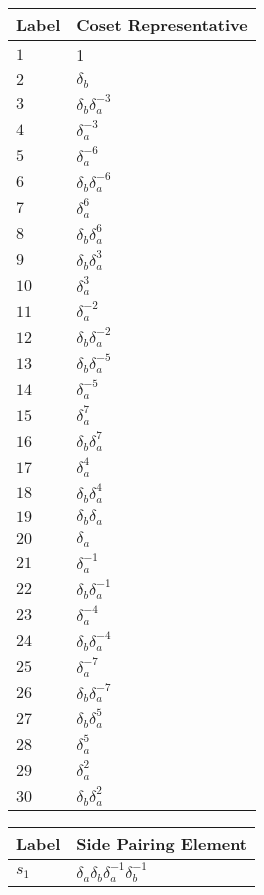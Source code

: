 \documentclass{article}
\begin{document}

\begin{center}
\begin{tabular}{ll}
\toprule
Label & Coset Representative\\
\midrule
$1$ & 1 \\
$2$ & $\delta_b^{}$ \\
$3$ & $\delta_b^{}\delta_a^{-3}$ \\
$4$ & $\delta_a^{-3}$ \\
$5$ & $\delta_a^{-6}$ \\
$6$ & $\delta_b^{}\delta_a^{-6}$ \\
$7$ & $\delta_a^{6}$ \\
$8$ & $\delta_b^{}\delta_a^{6}$ \\
$9$ & $\delta_b^{}\delta_a^{3}$ \\
$10$ & $\delta_a^{3}$ \\
$11$ & $\delta_a^{-2}$ \\
$12$ & $\delta_b^{}\delta_a^{-2}$ \\
$13$ & $\delta_b^{}\delta_a^{-5}$ \\
$14$ & $\delta_a^{-5}$ \\
$15$ & $\delta_a^{7}$ \\
$16$ & $\delta_b^{}\delta_a^{7}$ \\
$17$ & $\delta_a^{4}$ \\
$18$ & $\delta_b^{}\delta_a^{4}$ \\
$19$ & $\delta_b^{}\delta_a^{}$ \\
$20$ & $\delta_a^{}$ \\
$21$ & $\delta_a^{-1}$ \\
$22$ & $\delta_b^{}\delta_a^{-1}$ \\
$23$ & $\delta_a^{-4}$ \\
$24$ & $\delta_b^{}\delta_a^{-4}$ \\
$25$ & $\delta_a^{-7}$ \\
$26$ & $\delta_b^{}\delta_a^{-7}$ \\
$27$ & $\delta_b^{}\delta_a^{5}$ \\
$28$ & $\delta_a^{5}$ \\
$29$ & $\delta_a^{2}$ \\
$30$ & $\delta_b^{}\delta_a^{2}$ \\
\bottomrule
\end{tabular}
\hfill
\begin{tabular}{ll}
\toprule
Label & Side Pairing Element\\
\midrule
$s_{1}$ & $\delta_a^{}\delta_b^{}\delta_a^{-1}\delta_b^{-1}$ \\

\end{tabular}
\end{center}
\end{document}
